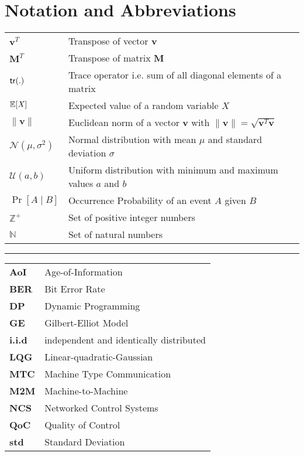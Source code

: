 \chapter*{Notation and Abbreviations}

\begin{tabular}{p{2cm} l} 
$\boldsymbol{v}^T$ & Transpose of vector $\boldsymbol{v}$\\
$\boldsymbol{M}^T$ & Transpose of matrix $\boldsymbol{M}$\\
$\mathsf{tr}(.)$ & Trace operator i.e. sum of all diagonal elements of a matrix\\
$\mathbb{E}[\mathit{X}]$ & Expected value of a random variable $\mathit{X}$\\
$\|\boldsymbol{v}\|$ & Euclidean norm of a vector $\boldsymbol{v}$ with $\|\boldsymbol{v}\|=\sqrt{\boldsymbol{v} ^T\boldsymbol{v}}$\\
$\mathcal{N}(\mu,\sigma^2)$ & Normal distribution with mean $\mu$ and standard deviation $\sigma$\\
$\mathcal{U}(a,b)$ & Uniform distribution with minimum and maximum values $a$ and $b$\\
$\Pr\left[A \mid B \right]$ & Occurrence Probability of an event $A$ given $B$\\
$\mathbb{Z}^+$ & Set of positive integer numbers\\
$\mathbb{N}$ & Set of natural numbers\\
\end{tabular}
\vspace{1cm}

\hrule
\vspace{1cm}
  
\begin{tabular}{>{\bfseries}p{2cm} l}
AoI & Age-of-Information\\
BER & Bit Error Rate\\
DP & Dynamic Programming\\
GE & Gilbert-Elliot Model\\
i.i.d & independent and identically distributed\\
LQG & Linear-quadratic-Gaussian\\
MTC & Machine Type Communication\\
M2M & Machine-to-Machine\\
NCS & Networked Control Systems\\
QoC & Quality of Control\\
std & Standard Deviation\\
\end{tabular}

